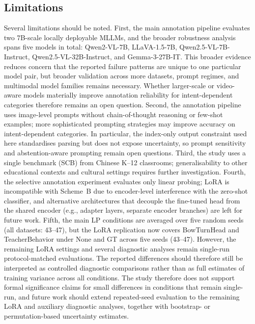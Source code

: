 \documentclass[10pt,letterpaper]{article}
\begin{document}
\subsection*{Limitations}
\label{sec:limitations}

Several limitations should be noted.
First, the main annotation pipeline evaluates two 7B-scale locally
deployable MLLMs, and the broader robustness analysis spans five
models in total: Qwen2-VL-7B, LLaVA-1.5-7B,
Qwen2.5-VL-7B-Instruct, Qwen2.5-VL-32B-Instruct, and Gemma-3-27B-IT.
This broader evidence reduces concern that the reported failure
patterns are unique to one particular model pair, but broader
validation across more datasets, prompt regimes, and multimodal model
families remains necessary.
Whether larger-scale or video-aware models materially improve
annotation reliability for intent-dependent categories therefore
remains an open question.
Second, the annotation pipeline uses image-level prompts without
chain-of-thought reasoning or few-shot examples; more sophisticated
prompting strategies may improve accuracy on intent-dependent
categories. In particular, the index-only output constraint used here
standardises parsing but does not expose uncertainty, so prompt
sensitivity and abstention-aware prompting remain open questions.
Third, the study uses a single benchmark
(SCB) from Chinese K--12 classrooms; generalisability to other
educational contexts and cultural settings requires further
investigation.
Fourth, the selective annotation experiment evaluates only linear
probing; LoRA is incompatible with Scheme~B due to encoder-level
interference with the zero-shot classifier, and alternative
architectures that decouple the fine-tuned head from the shared
encoder (e.g., adapter layers, separate encoder branches) are left
for future work.
Fifth, the main LP conditions are averaged over five random seeds
(all datasets: 43--47), but the
LoRA replication now covers BowTurnHead and TeacherBehavior under None
and GT across five seeds (43--47). However, the remaining LoRA
settings and several diagnostic analyses remain single-run
protocol-matched evaluations. The reported differences
should therefore still be interpreted as controlled diagnostic
comparisons rather than as full estimates of training variance across
all conditions.
The study therefore does not support formal significance claims for
small differences in conditions that remain single-run, and future
work should extend repeated-seed evaluation to the remaining LoRA and
auxiliary diagnostic analyses, together with bootstrap- or
permutation-based uncertainty estimates.
\end{document}
